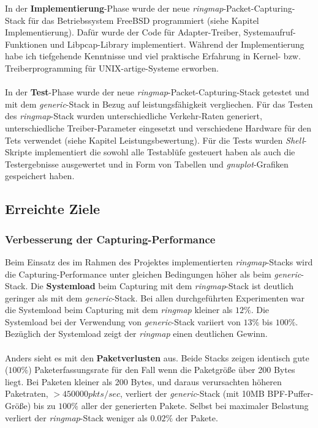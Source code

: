 {%
In der \textbf{Implementierung}-Phase wurde der neue
\emph{ringmap}-Packet-Capturing-Stack für das Betriebssystem FreeBSD
programmiert (siehe Kapitel Implementierung). Dafür wurde der Code für
Adapter-Treiber, Systemaufruf-Funktionen und Libpcap-Library implementiert.
Während der Implementierung  habe ich tiefgehende Kenntnisse und viel
praktische Erfahrung in  Kernel- bzw. Treiberprogramming für
UNIX-artige-Systeme erworben.  \\\\
%
In der \textbf{Test}-Phase wurde der neue \emph{ringmap}-Packet-Capturing-Stack
getestet und mit dem \emph{generic}-Stack in Bezug auf leistungsfähigkeit
vergliechen. Für das Testen des \emph{ringmap}-Stack wurden unterschiedliche
Verkehr-Raten generiert, unterschiedliche Treiber-Parameter eingesetzt und
verschiedene Hardware für den Tets verwendet (siehe Kapitel
Leistungsbewertung). Für die Tests wurden \emph{Shell}-Skripte implementiert
die sowohl alle Testablüfe gesteuert haben als auch die Testergebnisse
ausgewertet und in Form von Tabellen und \emph{gnuplot}-Grafiken gespeichert
haben. 
}
\subsection{Erreichte Ziele}

\subsubsection{Verbesserung der Capturing-Performance}
Beim Einsatz des im Rahmen des Projektes implementierten
\emph{ringmap}-Stacks wird die Capturing-Performance unter gleichen Bedingungen
höher als beim \emph{generic}-Stack. Die \textbf{Systemload} beim Capturing mit
dem \emph{ringmap}-Stack ist deutlich geringer als mit dem \emph{generic}-Stack.
Bei allen durchgeführten Experimenten war die Systemload beim Capturing mit dem
\emph{ringmap} kleiner als $12\%$. Die Systemload bei der Verwendung von
\emph{generic}-Stack variiert von $13\%$ bis $100\%$. Bezüglich der
Systemload zeigt der \emph{ringmap} einen deutlichen Gewinn.\\\\
%
Anders sieht es mit den \textbf{Paketverlusten} aus. Beide Stacks zeigen
identisch gute ($100\%$) Paketerfassungsrate für den Fall wenn die Paketgröße
über 200 Bytes liegt. Bei Paketen kleiner als 200 Bytes, und daraus
verursachten höheren Paketraten, $> 450000 pkts/sec$, verliert der
\emph{generic}-Stack (mit 10MB BPF-Puffer-Größe) bis zu $100\%$ aller der
generierten Pakete. Selbst bei maximaler Belastung verliert der \emph{ringmap}-Stack 
weniger als $0.02\%$ der Pakete.
%
